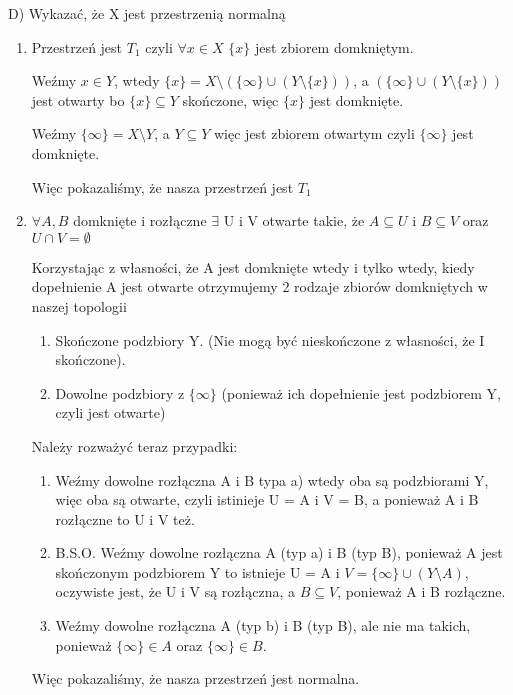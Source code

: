 \documentclass[12pt,a4paper]{article}
\begin{document}
D) Wykazać, że X jest przestrzenią normalną
    \begin{enumerate}
        \item Przestrzeń jest $T_1$ czyli $\forall x \in X$  $\{x\}$ jest zbiorem domkniętym.
        
        Weźmy $x\in Y$, wtedy $\{x\} = X \setminus (\{\infty\} \cup (Y\setminus \{x\}))$, a $(\{\infty\} \cup (Y\setminus \{x\}))$ jest otwarty bo $\{x\} \subseteq Y$ skończone, więc $\{x\}$ jest domknięte.
        
        Weźmy $\{\infty\} = X \setminus Y$, a $Y\subseteq Y$ więc jest zbiorem otwartym czyli $\{\infty\}$ jest domknięte.
        
        Więc pokazaliśmy, że nasza przestrzeń jest $T_1$
    \item $\forall A, B$ domknięte i rozłączne $\exists$ U i V otwarte takie, że $A \subseteq U$ i $B \subseteq V$ oraz $U \cap V = \emptyset$
    
    Korzystając z własności, że A jest domknięte wtedy i tylko wtedy, kiedy dopełnienie A jest otwarte otrzymujemy 2 rodzaje zbiorów domkniętych w naszej topologii
    \begin{enumerate}
        \item Skończone podzbiory Y. (Nie mogą być nieskończone z własności, że I skończone).
        \item Dowolne podzbiory z $\{\infty\}$ (ponieważ ich dopełnienie jest podzbiorem Y, czyli jest otwarte)
    \end{enumerate}
    Należy rozważyć teraz przypadki:
    \begin{enumerate}
        \item Weźmy dowolne rozłączna A i B typa a) wtedy oba są podzbiorami Y, więc oba są otwarte, czyli istinieje U = A i V = B, a ponieważ A i B rozłączne to U i V też.
        \item B.S.O. Weźmy dowolne rozłączna A (typ a) i B (typ B), ponieważ A jest skończonym podzbiorem Y to istnieje U = A i $V = \{\infty\} \cup (Y \setminus A)$, oczywiste jest, że U i V są rozłączna, a $B \subseteq V$, ponieważ A i B rozłączne.
        \item Weźmy dowolne rozłączna A (typ b) i B (typ B), ale nie ma takich, ponieważ $\{\infty\} \in A$ oraz $\{\infty\} \in B$.
        \end{enumerate} 
    Więc pokazaliśmy, że nasza przestrzeń jest normalna.
    
    \end{enumerate}
\end{document}
